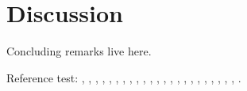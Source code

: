 \section{Discussion}
\label{sec:discussion}

Concluding remarks live here.

Reference test:
\cite{ArcherWest2003},
\cite{BarrettJolleyetal2010},
\cite{BuckwalterMankin1998},
\cite{CarneyMuir1988},
\cite{Chaetal2009},
\cite{Chuetal2006},
\cite{Clarketal2011},
\cite{Grishkoetal2010},
\cite{Halletal1996},
\cite{Hille2001},
\cite{HorriganAldrich2002},
\cite{LesageLazdunski2000},
\cite{Lewisetal2011},
\cite{Maleckaretal2009},
\cite{Mankin1982},
\cite{MillwardSadleretal2000},
\cite{Nygrenetal1998},
\cite{Poole1997},
\cite{RadhakrishnanHindmarsh1993},
\cite{Scholz2002},
\cite{Stockwell1991},
\cite{Sugimotoetal1996},
\cite{Tsugaetal2001},
\cite{UNKNOWN}.


